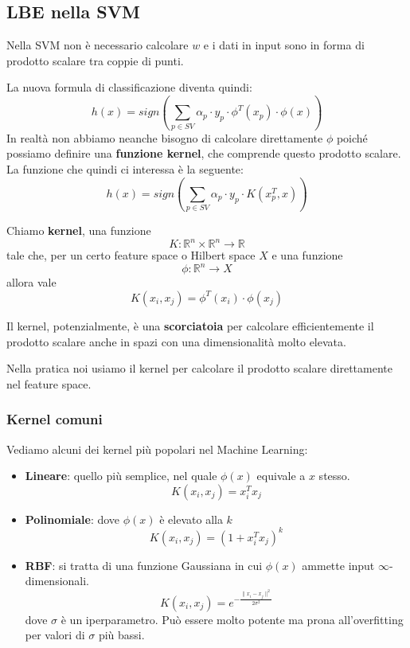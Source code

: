 \subsection{LBE nella SVM}
Nella SVM non \`e necessario calcolare $w$ e i dati in input sono in forma di prodotto scalare tra coppie di punti.

La nuova formula di classificazione diventa quindi:
\[ h(x) = sign \left( \sum_{p \in SV} \alpha_p \cdot y_p \cdot \phi^T(x_p) \cdot \phi(x)  \right) \]
In realt\`a non abbiamo neanche bisogno di calcolare direttamente $\phi$ poich\'e possiamo definire una
\textbf{funzione kernel}, che comprende questo prodotto scalare. La funzione che quindi ci interessa \`e la seguente:
\[ h(x) = sign \left( \sum_{p \in SV} \alpha_p \cdot y_p \cdot K(x_p^T, x) \right) \]

\begin{definition}
	Chiamo \textbf{kernel}, una funzione
	\[ K : \mathbb{R}^n \times \mathbb{R}^n \rightarrow \mathbb{R} \]
	tale che, per un certo feature space o Hilbert space $X$ e una funzione
	\[ \phi : \mathbb{R}^n \rightarrow X \]
	allora vale
	\[ K(x_i, x_j) = \phi^T(x_i) \cdot \phi(x_j) \]
\end{definition}
Il kernel, potenzialmente, \`e una \textbf{scorciatoia} per calcolare efficientemente il prodotto scalare anche in spazi con
una dimensionalit\`a molto elevata.

Nella pratica noi usiamo il kernel per calcolare il prodotto scalare direttamente nel feature space.

\subsubsection{Kernel comuni}
Vediamo alcuni dei kernel pi\`u popolari nel Machine Learning:
\begin{itemize}
	\item \textbf{Lineare}: quello pi\`u semplice, nel quale $\phi(x)$ equivale a $x$ stesso.
	      \[ K(x_i, x_j) = x_i^T x_j \]
	\item \textbf{Polinomiale}: dove $\phi(x)$ \`e elevato alla $k$
	      \[ K(x_i, x_j) = (1 + x_i^T x_j)^k \]
	\item \textbf{RBF}: si tratta di una funzione Gaussiana in cui $\phi(x)$ ammette input $\infty$-dimensionali.
	      \[ K(x_i, x_j) = e^{-\displaystyle\frac{\| x_i - x_j \|^2}{2 \sigma^2}} \]
	      dove $\sigma$ \`e un iperparametro. Pu\`o essere molto potente ma prona all'overfitting per valori di
	      $\sigma$ pi\`u bassi.
\end{itemize}

